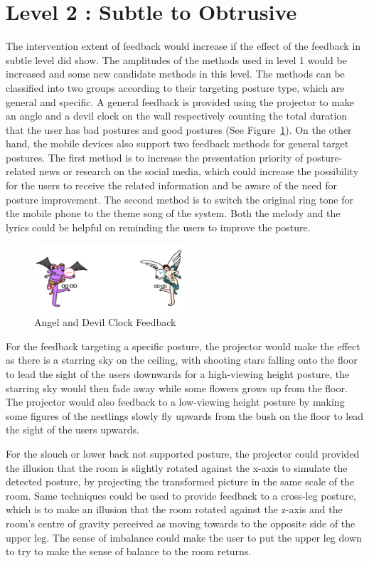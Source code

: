 \section{Level 2 : Subtle to Obtrusive}
The intervention extent of feedback would increase if the effect of the feedback in subtle level did show. The amplitudes of the methods used in level 1 would be increased and some new candidate methods in this level. The methods can be classified into two groups according to their targeting posture type, which are general and specific. A general feedback is provided using the projector to make an angle and a devil clock on the wall respectively counting the total duration that the user has bad postures and good postures (See Figure~\ref{fig:adc}). On the other hand, the mobile devices also support two feedback methods for general target postures. The first method is to increase the presentation priority of posture-related news or research on the social media, which could increase the possibility for the users to receive the related information and be aware of the need for posture improvement. The second method is to switch the original ring tone for the mobile phone to the theme song of the system. Both the melody and the lyrics could be helpful on reminding the users to improve the posture. 

\begin{figure}[h]
\centering
  \includegraphics[width=0.5\textwidth]{figs/ad}
\caption{Angel and Devil Clock Feedback}
\label{fig:adc}
\end{figure}

For the feedback targeting a specific posture, the projector would make the effect as there is a starring sky on the ceiling, with shooting stars falling onto the floor to lead the sight of the users downwards for a high-viewing height posture, the starring sky would then fade away while some flowers grows up from the floor. The projector would also feedback to a low-viewing height posture by making some figures of the nestlings slowly fly upwards from the bush on the floor to lead the sight of the users upwards.

For the slouch or lower back not supported posture, the projector could provided the illusion that the room is slightly rotated against the x-axis to simulate the detected posture, by projecting the transformed picture in the same scale of the room. Same techniques could be used to provide feedback to a cross-leg posture, which is to make an illusion that the room rotated against the z-axis and the room’s centre of gravity perceived as moving towards to the opposite side of the upper leg. The sense of imbalance could make the user to put the upper leg down to try to make the sense of balance to the room returns.

